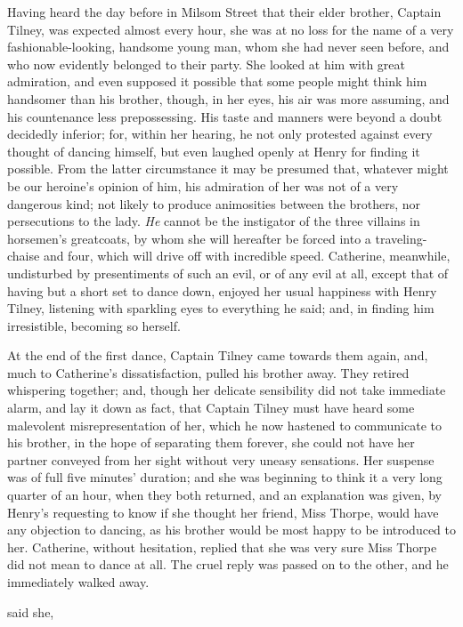 Having heard the day before in Milsom Street that their elder brother, Captain Tilney, was expected almost every hour, she was at no loss for the name of a very fashionable-looking, handsome young man, whom she had never seen before, and who now evidently belonged to their party. She looked at him with great admiration, and even supposed it possible that some people might think him handsomer than his brother, though, in her eyes, his air was more assuming, and his countenance less prepossessing. His taste and manners were beyond a doubt decidedly inferior; for, within her hearing, he not only protested against every thought of dancing himself, but even laughed openly at Henry for finding it possible. From the latter circumstance it may be presumed that, whatever might be our heroine's opinion of him, his admiration of her was not of a very dangerous kind; not likely to produce animosities between the brothers, nor persecutions to the lady. {\em He} cannot be the instigator of the three villains in horsemen's greatcoats, by whom she will hereafter be forced into a traveling-chaise and four, which will drive off with incredible speed. Catherine, meanwhile, undisturbed by presentiments of such an evil, or of any evil at all, except that of having but a short set to dance down, enjoyed her usual happiness with Henry Tilney, listening with sparkling eyes to everything he said; and, in finding him irresistible, becoming so herself.

At the end of the first dance, Captain Tilney came towards them again, and, much to Catherine's dissatisfaction, pulled his brother away. They retired whispering together; and, though her delicate sensibility did not take immediate alarm, and lay it down as fact, that Captain Tilney must have heard some malevolent misrepresentation of her, which he now hastened to communicate to his brother, in the hope of separating them forever, she could not have her partner conveyed from her sight without very uneasy sensations. Her suspense was of full five minutes' duration; and she was beginning to think it a very long quarter of an hour, when they both returned, and an explanation was given, by Henry's requesting to know if she thought her friend, Miss Thorpe, would have any objection to dancing, as his brother would be most happy to be introduced to her. Catherine, without hesitation, replied that she was very sure Miss Thorpe did not mean to dance at all. The cruel reply was passed on to the other, and he immediately walked away.

 said she, 


